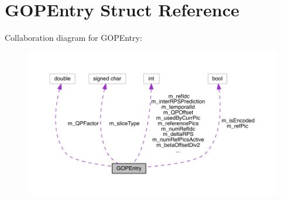 \hypertarget{struct_g_o_p_entry}{}\section{G\+O\+P\+Entry Struct Reference}
\label{struct_g_o_p_entry}


Collaboration diagram for G\+O\+P\+Entry\+:
\nopagebreak
\begin{figure}[H]
\begin{center}
\leavevmode
\includegraphics[width=350pt]{dd/d09/struct_g_o_p_entry__coll__graph}
\end{center}
\end{figure}
